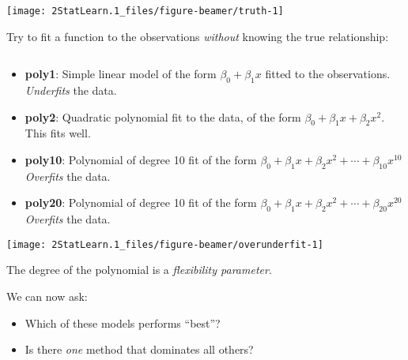 \documentclass[ignorenonframetext,]{beamer}
\begin{document}
\begin{frame}

\begin{center}\texttt{[image: 2StatLearn.1\_files/figure-beamer/truth-1]} \end{center}

\end{frame}

\begin{frame}

Try to fit a function to the observations \emph{without} knowing the
true relationship:

\(~\)

\begin{itemize}
\item
  \textbf{poly1}: Simple linear model of the form \(\beta_0+\beta_1 x\)
  fitted to the observations. \emph{Underfits} the data.
\item
  \textbf{poly2}: Quadratic polynomial fit to the data, of the form
  \(\beta_0+\beta_1 x +\beta_2 x^2\). This fits well.
\item
  \textbf{poly10}: Polynomial of degree 10 fit of the form
  \(\beta_0+\beta_1 x +\beta_2 x^2+\cdots +\beta_{10}x^{10}\)
  \emph{Overfits} the data.
\item
  \textbf{poly20}: Polynomial of degree 10 fit of the form
  \(\beta_0+\beta_1 x +\beta_2 x^2+\cdots +\beta_{20}x^{20}\)
  \emph{Overfits} the data.
\end{itemize}

\end{frame}

\begin{frame}

\begin{center}\texttt{[image: 2StatLearn.1\_files/figure-beamer/overunderfit-1]} \end{center}

The degree of the polynomial is a \emph{flexibility parameter}.

\end{frame}

\begin{frame}

We can now ask:

\begin{itemize}
\item
  Which of these models performs ``best''?
\item
  Is there \emph{one} method that dominates all others?
\end{itemize}

\end{frame}
\end{document}
